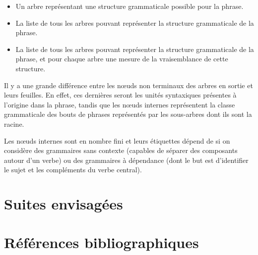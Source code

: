 \documentclass[a4paper,12pt]{article}
\begin{document}
\begin{itemize}
	\item Un arbre représentant une structure grammaticale possible pour la phrase.
	\item La liste de tous les arbres pouvant représenter la structure grammaticale de la phrase.
	\item La liste de tous les arbres pouvant représenter la structure grammaticale de la phrase, et pour chaque arbre une mesure de la vraisemblance de cette structure.
\end{itemize} 

Il y a une grande différence entre les n\oe{}uds non terminaux des arbres en sortie et leurs feuilles. En effet, ces dernières seront les unités syntaxiques présentes à l'origine dans la phrase, tandis que les n\oe{}uds internes représentent la classe grammaticale des bouts de phrases représentés par les sous-arbres dont ils sont la racine.


Les n\oe{}uds internes sont en nombre fini et leurs étiquettes dépend de si on considère des grammaires sans contexte (capables de séparer des composants autour d'un verbe) ou des grammaires à dépendance (dont le but est d'identifier le sujet et les compléments du verbe central).


\section{Suites envisag\'ees}

\section{R\'ef\'erences bibliographiques}

\nocite{*}
\printbibliography{}



\appendix

\printindex
\end{document}
